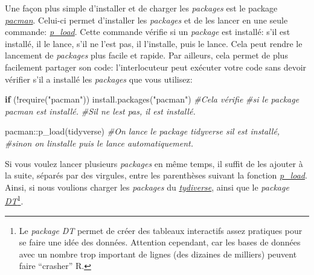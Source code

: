 \documentclass[
]{book}
\newenvironment{Shaded}{\begin{snugshade}}{\end{snugshade}}
\newcommand{\CommentTok}[1]{\textcolor[rgb]{0.56,0.35,0.01}{\textit{#1}}}
\newcommand{\ControlFlowTok}[1]{\textcolor[rgb]{0.13,0.29,0.53}{\textbf{#1}}}
\newcommand{\FunctionTok}[1]{\textcolor[rgb]{0.00,0.00,0.00}{#1}}
\newcommand{\NormalTok}[1]{#1}
\newcommand{\SpecialCharTok}[1]{\textcolor[rgb]{0.00,0.00,0.00}{#1}}
\newcommand{\StringTok}[1]{\textcolor[rgb]{0.31,0.60,0.02}{#1}}
\begin{document}
Une façon plus simple d'installer et de charger les \emph{packages} est le package \href{http://trinker.github.io/pacman/vignettes/Introduction_to_pacman.html}{\emph{pacman}}. Celui-ci permet d'installer les \emph{packages} et de les lancer en une seule commande: \href{https://www.rdocumentation.org/packages/pacman/versions/0.5.1/topics/p_load}{\emph{p\_load}}. Cette commande vérifie si un \emph{package} est installé: s'il est installé, il le lance, s'il ne l'est pas, il l'installe, puis le lance. Cela peut rendre le lancement de \emph{packages} plus facile et rapide. Par ailleurs, cela permet de plus facilement partager son code: l'interlocuteur peut exécuter votre code sans devoir vérifier s'il a installé les \emph{packages} que vous utilisez:

\begin{Shaded}
\begin{Highlighting}[]
\ControlFlowTok{if}\NormalTok{ (}\SpecialCharTok{!}\FunctionTok{require}\NormalTok{(}\StringTok{"pacman"}\NormalTok{)) }\FunctionTok{install.packages}\NormalTok{(}\StringTok{"pacman"}\NormalTok{) }\CommentTok{\#Cela vérifie}
                             \CommentTok{\#si le package pacman est installé.}
                             \CommentTok{\#S\textquotesingle{}il ne l\textquotesingle{}est pas, il est installé.}

\NormalTok{pacman}\SpecialCharTok{::}\FunctionTok{p\_load}\NormalTok{(tidyverse) }\CommentTok{\#On lance le package tidyverse s\textquotesingle{}il est installé,}
                          \CommentTok{\#sinon on l\textquotesingle{}installe puis le lance automatiquement.}
\end{Highlighting}
\end{Shaded}

Si vous voulez lancer plusieurs \emph{packages} en même temps, il suffit de les ajouter à la suite, séparés par des virgules, entre les parenthèses suivant la fonction \href{https://www.rdocumentation.org/packages/pacman/versions/0.5.1/topics/p_load}{\emph{p\_load}}. Ainsi, si nous voulions charger les \emph{packages} du \href{https://www.tidyverse.org/}{\emph{tydiverse}}, ainsi que le \emph{package} \href{https://rstudio.github.io/DT/}{\emph{DT}}\footnote{Le \emph{package} \emph{DT} permet de créer des tableaux interactifs assez pratiques pour se faire une idée des données. Attention cependant, car les bases de données avec un nombre trop important de lignes (des dizaines de milliers) peuvent faire ``crasher'' R.}.
\end{document}
